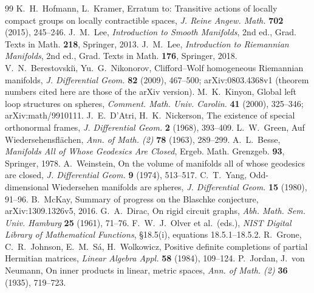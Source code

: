 \documentclass[11pt,reqno]{amsart}
\theoremstyle{definition}
\theoremstyle{remark}
\numberwithin{equation}{section}
\begin{document}
\begin{thebibliography}{99}
 K.~H.~Hofmann, L.~Kramer, Erratum to: Transitive actions of locally compact groups on locally contractible spaces, \emph{J. Reine Angew. Math.} \textbf{702} (2015), 245--246.
 J.~M.~Lee, \emph{Introduction to Smooth Manifolds}, 2nd ed., Grad. Texts in Math. \textbf{218}, Springer, 2013.
 J.~M.~Lee, \emph{Introduction to Riemannian Manifolds}, 2nd ed., Grad. Texts in Math. \textbf{176}, Springer, 2018.
 V.~N.~Berestovski\u{\i}, Yu.~G.~Nikonorov, Clifford--Wolf homogeneous Riemannian manifolds, \emph{J. Differential Geom.} \textbf{82} (2009), 467--500; arXiv:0803.4368v1 (theorem numbers cited here are those of the arXiv version).
 M.~K.~Kinyon, Global left loop structures on spheres, \emph{Comment. Math. Univ. Carolin.} \textbf{41} (2000), 325--346; arXiv:math/9910111.
 J.~E.~D'Atri, H.~K.~Nickerson, The existence of special orthonormal frames, \emph{J. Differential Geom.} \textbf{2} (1968), 393--409.
 L.~W.~Green, Auf Wiedersehensfl\"achen, \emph{Ann. of Math. (2)} \textbf{78} (1963), 289--299.
 A.~L.~Besse, \emph{Manifolds All of Whose Geodesics Are Closed}, Ergeb. Math. Grenzgeb. \textbf{93}, Springer, 1978.
 A.~Weinstein, On the volume of manifolds all of whose geodesics are closed, \emph{J. Differential Geom.} \textbf{9} (1974), 513--517.
 C.~T.~Yang, Odd-dimensional Wiedersehen manifolds are spheres, \emph{J. Differential Geom.} \textbf{15} (1980), 91--96.
 B.~McKay, Summary of progress on the Blaschke conjecture, arXiv:1309.1326v5, 2016.
 G.~A.~Dirac, On rigid circuit graphs, \emph{Abh. Math. Sem. Univ. Hamburg} \textbf{25} (1961), 71--76.
 F.~W.~J.~Olver et al.\ (eds.), \emph{NIST Digital Library of Mathematical Functions}, \S18.5(i), equations 18.5.1--18.5.2.
 R.~Grone, C.~R.~Johnson, E.~M.~S\'a, H.~Wolkowicz, Positive definite completions of partial Hermitian matrices, \emph{Linear Algebra Appl.} \textbf{58} (1984), 109--124.
 P.~Jordan, J.~von Neumann, On inner products in linear, metric spaces, \emph{Ann. of Math. (2)} \textbf{36} (1935), 719--723.

\end{thebibliography}
\end{document}
